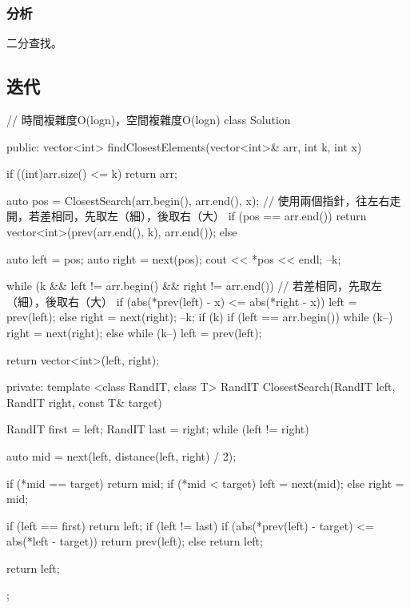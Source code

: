 \subsubsection{分析}
二分查找。


\subsection{迭代}
\begin{Code}
// 時間複雜度O(logn)，空間複雜度O(logn)
class Solution {
public:
    vector<int> findClosestElements(vector<int>& arr, int k, int x) {
        if ((int)arr.size() <= k) return arr;

        auto pos = ClosestSearch(arr.begin(), arr.end(), x);
        // 使用兩個指針，往左右走開，若差相同，先取左（細），後取右（大）
        if (pos == arr.end()) {
            return vector<int>(prev(arr.end(), k), arr.end());
        }
        else {
            auto left = pos;
            auto right = next(pos);
            cout << *pos << endl;
            --k;

            while (k && left != arr.begin() && right != arr.end()) {
                // 若差相同，先取左（細），後取右（大）
                if (abs(*prev(left) - x) <= abs(*right - x))
                    left = prev(left);
                else
                    right = next(right);
                --k;
            }
            if (k) {
                if (left == arr.begin()) {
                    while (k--) right = next(right);
                }
                else {
                    while (k--) left = prev(left);
                }
            }

            return vector<int>(left, right);
        }
    }
private:
    template <class RandIT, class T>
        RandIT ClosestSearch(RandIT left, RandIT right, const T& target) {
        RandIT first = left;
        RandIT last = right;
        while (left != right) {
            auto mid = next(left, distance(left, right) / 2);

            if (*mid == target) return mid;
            if (*mid < target)
                left = next(mid);
            else
                right = mid;
        }

        if (left == first) return left;
        if (left != last) {
            if (abs(*prev(left) - target) <= abs(*left - target))
                return prev(left);
            else
                return left;
        }

        return left;
    }
};
\end{Code}


